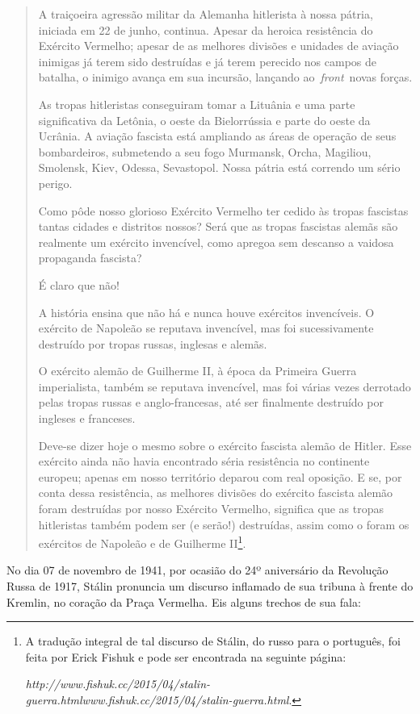 \begin{quote}
A traiçoeira agressão militar da Alemanha hitlerista à nossa pátria,
iniciada em 22 de junho, continua. Apesar da heroica resistência do
Exército Vermelho; apesar de as melhores divisões e unidades de aviação
inimigas já terem sido destruídas e já terem perecido nos campos de
batalha, o inimigo avança em sua incursão, lançando
ao~\emph{front}~novas forças.

As tropas hitleristas conseguiram tomar a Lituânia e uma parte
significativa da Letônia, o oeste da Bielorrússia e parte do oeste da
Ucrânia. A aviação fascista está ampliando as áreas de operação de seus
bombardeiros, submetendo a seu fogo Murmansk, Orcha, Magiliou, Smolensk,
Kiev, Odessa, Sevastopol. Nossa pátria está correndo um sério perigo.

Como pôde nosso glorioso Exército Vermelho ter cedido às tropas
fascistas tantas cidades e distritos nossos? Será que as tropas
fascistas alemãs são realmente um exército invencível, como apregoa sem
descanso a vaidosa propaganda fascista?

É claro que não!

A história ensina que não há e nunca houve exércitos invencíveis. O
exército de Napoleão se reputava invencível, mas foi sucessivamente
destruído por tropas russas, inglesas e alemãs.

O exército alemão de Guilherme II, à época da Primeira Guerra
imperialista, também se reputava invencível, mas foi várias vezes
derrotado pelas tropas russas e anglo-francesas, até ser finalmente
destruído por ingleses e franceses.

Deve-se dizer hoje o mesmo sobre o exército fascista alemão de Hitler.
Esse exército ainda não havia encontrado séria resistência no continente
europeu; apenas em nosso território deparou com real oposição. E se, por
conta dessa resistência, as melhores divisões do exército fascista
alemão foram destruídas por nosso Exército Vermelho, significa que as
tropas hitleristas também podem ser (e serão!) destruídas, assim como o
foram os exércitos de Napoleão e de Guilherme II\footnote{A tradução
  integral de tal discurso de Stálin, do russo para o português, foi
  feita por Erick Fishuk e pode ser encontrada na seguinte página:

  \emph{http://www.fishuk.cc/2015/04/stalin-guerra.html}{\emph{www.fishuk.cc/2015/04/stalin-guerra.html}}.}.
\end{quote}

No dia 07 de novembro de 1941, por ocasião do 24º aniversário da
Revolução Russa de 1917, Stálin pronuncia um discurso inflamado de sua
tribuna à frente do Kremlin, no coração da Praça Vermelha. Eis alguns
trechos de sua fala:

